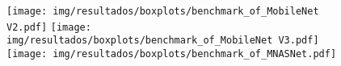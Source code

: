 \begin{figure}[h!]
	\texttt{[image: img/resultados/boxplots/benchmark\_of\_MobileNet V2.pdf]}
	\texttt{[image: img/resultados/boxplots/benchmark\_of\_MobileNet V3.pdf]}
	\texttt{[image: img/resultados/boxplots/benchmark\_of\_MNASNet.pdf]}
	\caption{}
	\label{fig:Time_of_Mobile nets}
\end{figure}
